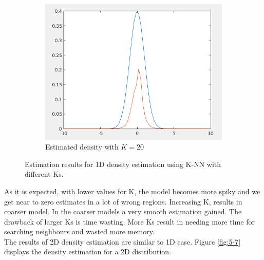 \documentclass[12pt]{article}
\begin{document}
\begin{itemize}
\begin{figure}
\begin{subfigure}{0.45\textwidth}
\includegraphics[scale=0.35]{Imgs/5-16.png}
\caption{Estimated density with $K = 20$}
\end{subfigure}
\caption{Estimation results for 1D density estimation using K-NN with different Ks.}
\label{fig:5-6}
\end{figure}

As it is expected, with lower values for K, the model becomes more spiky and we get near to zero estimates in a lot of wrong regions. Increasing K, results in coarser model. In the coarser models a very smooth estimation gained. The drawback of larger Ks is time wasting. More Ks result in needing more time for searching neighbours and wasted more memory. \\
The results of 2D density estimation are similar to 1D case. Figure \ref{fig:5-7} displays the density estimation for a 2D distribution. 



\end{itemize}
\end{document}
